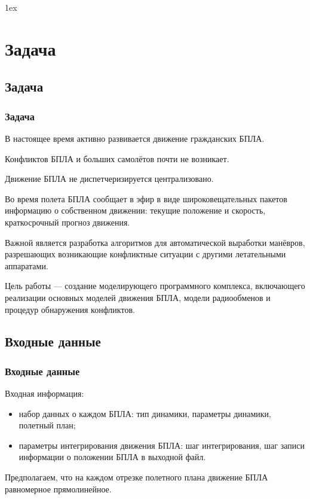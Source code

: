 \documentclass[10pt,t]{beamer}
\begin{document}
\parskip 1ex
%
%
%
%

\section[Задача]{Задача}
\subsection[Задача]{Задача}
\begin{frame}
\frametitle{Задача}
\small 
В настоящее время активно развивается движение гражданских БПЛА. 

Конфликтов БПЛА и больших самолётов почти не возникает. 

Движение БПЛА не диспетчеризируется централизовано. 

Во время полета БПЛА сообщает в эфир в виде широковещательных пакетов информацию о собственном движении: текущие положение и скорость, краткосрочный прогноз движения. 

Важной является разработка алгоритмов для автоматической выработки манёвров, разрешающих возникающие конфликтные ситуации с другими летательными аппаратами. 

Цель работы ---  создание моделирующего программного комплекса, включающего реализации основных моделей движения БПЛА, модели радиообменов и процедур обнаружения конфликтов.
\end{frame}

\subsection[Входные данные]{Входные данные}
\begin{frame}
\frametitle{Входные данные}
\small
Входная информация: 
\begin{itemize}
\item  набор данных о каждом БПЛА:  тип динамики, параметры динамики, полетный план; 
\item параметры интегрирования движения БПЛА: шаг интегрирования, шаг записи информации о положении БПЛА в выходной файл.
\end{itemize}
Предполагаем, что на каждом отрезке полетного плана движение БПЛА равномерное прямолинейное.
\end{frame}
\end{document}
